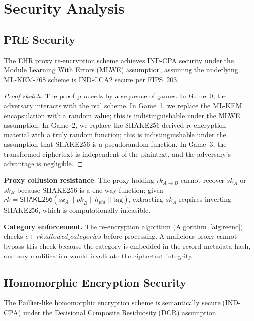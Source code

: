 \documentclass[conference,10pt]{IEEEtran}
\newcommand{\mlkem}{\textsf{ML-KEM}}
\newcommand{\shake}{\textsf{SHAKE256}}
\begin{document}
\section{Security Analysis}
\label{sec:security}

\subsection{PRE Security}

\begin{theorem}
The EHR proxy re-encryption scheme achieves IND-CPA security under the Module Learning With Errors (MLWE) assumption, assuming the underlying \mlkem{}-768 scheme is IND-CCA2 secure per FIPS~203.
\end{theorem}

\begin{proof}[Proof sketch]
The proof proceeds by a sequence of games. In Game~0, the adversary interacts with the real scheme. In Game~1, we replace the \mlkem{} encapsulation with a random value; this is indistinguishable under the MLWE assumption. In Game~2, we replace the \shake{}-derived re-encryption material with a truly random function; this is indistinguishable under the assumption that \shake{} is a pseudorandom function. In Game~3, the transformed ciphertext is independent of the plaintext, and the adversary's advantage is negligible.
\end{proof}

\textbf{Proxy collusion resistance.} The proxy holding $\mathit{rk}_{A \to B}$ cannot recover $\mathit{sk}_A$ or $\mathit{sk}_B$ because \shake{} is a one-way function: given $\mathit{rk} = \shake{}(\mathit{sk}_A \| \mathit{pk}_B \| h_{\mathit{pid}} \| \text{tag})$, extracting $\mathit{sk}_A$ requires inverting \shake{}, which is computationally infeasible.

\textbf{Category enforcement.} The re-encryption algorithm (Algorithm~\ref{alg:reenc}) checks $c \in \mathit{rk}.\mathit{allowed\_categories}$ before processing. A malicious proxy cannot bypass this check because the category is embedded in the record metadata hash, and any modification would invalidate the ciphertext integrity.

\subsection{Homomorphic Encryption Security}

\begin{theorem}
The Paillier-like homomorphic encryption scheme is semantically secure (IND-CPA) under the Decisional Composite Residuosity (DCR) assumption.
\end{theorem}
\end{document}
